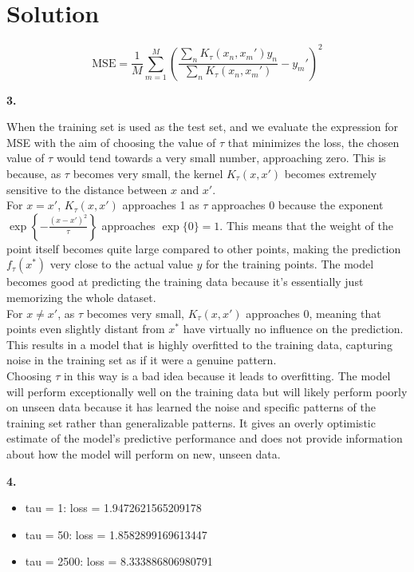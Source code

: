 \documentclass[submit]{harvardml}
\newenvironment{solution}
  {\color{blue}\section*{Solution}}
{}
\begin{document}
\begin{solution}
$$
\text{MSE} = \frac{1}{M} \sum_{m=1}^M \left(\frac{\sum_n K_\tau\left(x_n, x_m'\right) y_n}{\sum_n K_\tau\left(x_n, x_m'\right)} - y_m'\right)^2
$$

\bigskip
\textbf{3.}

When the training set is used as the test set, and we evaluate the expression for MSE with the aim of choosing the value of \(\tau\) that minimizes the loss, the chosen value of \(\tau\) would tend towards a very small number, approaching zero. This is because, as \(\tau\) becomes very small, the kernel \(K_\tau(x, x')\) becomes extremely sensitive to the distance between \(x\) and \(x'\).\\

For \(x = x'\), \(K_\tau(x, x')\) approaches 1 as \(\tau\) approaches 0 because the exponent \(\exp\left\{-\frac{(x-x')^2}{\tau}\right\}\) approaches \(\exp\{0\} = 1\). This means that the weight of the point itself becomes quite large compared to other points, making the prediction \(f_\tau(x^*)\) very close to the actual value \(y\) for the training points. The model becomes good at predicting the training data because it's essentially just memorizing the whole dataset. \\

For \(x \neq x'\), as \(\tau\) becomes very small, \(K_\tau(x, x')\) approaches 0, meaning that points even slightly distant from \(x^*\) have virtually no influence on the prediction. This results in a model that is highly overfitted to the training data, capturing noise in the training set as if it were a genuine pattern.\\

Choosing \(\tau\) in this way is a bad idea because it leads to overfitting. The model will perform exceptionally well on the training data but will likely perform poorly on unseen data because it has learned the noise and specific patterns of the training set rather than generalizable patterns. It gives an overly optimistic estimate of the model's predictive performance and does not provide information about how the model will perform on new, unseen data.


\bigskip
\textbf{4.}

\begin{itemize}
    \item tau = 1: loss = 1.9472621565209178
    \item tau = 50: loss = 1.8582899169613447
    \item tau = 2500: loss = 8.333886806980791
\end{itemize}


\end{solution}
\end{document}
